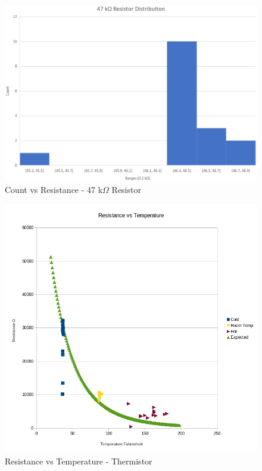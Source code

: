\documentclass{article}
\begin{document}
\begin{figure}[H]
	\begin{center}
		\includegraphics[width=12cm]{47k_resistor}
	\end{center}
	\caption{Count vs Resistance - 47 k$\Omega$ Resistor}
\end{figure}

\begin{figure}[H]
	\begin{center}
		\includegraphics[width=12cm]{lab_1_thermistor_fig}
	\end{center}
	\caption{Resistance vs Temperature - Thermistor}
\end{figure}
\end{document}
